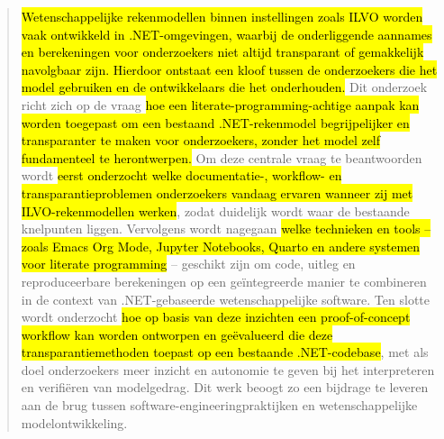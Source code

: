 \documentclass{hogent-article}
\begin{document}
\begin{abstract}

  \hl{Wetenschappelijke rekenmodellen binnen instellingen zoals ILVO worden vaak ontwikkeld in .NET-omgevingen, waarbij de onderliggende aannames en berekeningen voor onderzoekers niet altijd transparant of gemakkelijk navolgbaar zijn. Hierdoor ontstaat een kloof tussen de onderzoekers die het model gebruiken en de ontwikkelaars die het onderhouden.} Dit onderzoek richt zich op de vraag \hl{hoe een literate-programming-achtige aanpak kan worden toegepast om een bestaand .NET-rekenmodel begrijpelijker en transparanter te maken voor onderzoekers, zonder het model zelf fundamenteel te herontwerpen.} Om deze centrale vraag te beantwoorden wordt \hl{eerst onderzocht welke documentatie-, workflow- en transparantieproblemen onderzoekers vandaag ervaren wanneer zij met ILVO-rekenmodellen werken}, zodat duidelijk wordt waar de bestaande knelpunten liggen. Vervolgens wordt nagegaan \hl{welke technieken en tools – zoals Emacs Org Mode, Jupyter Notebooks, Quarto en andere systemen voor literate programming} – geschikt zijn om code, uitleg en reproduceerbare berekeningen op een geïntegreerde manier te combineren in de context van .NET-gebaseerde wetenschappelijke software. Ten slotte wordt onderzocht \hl{hoe op basis van deze inzichten een proof-of-concept workflow kan worden ontworpen en geëvalueerd die deze transparantiemethoden toepast op een bestaande .NET-codebase}, met als doel onderzoekers meer inzicht en autonomie te geven bij het interpreteren en verifiëren van modelgedrag. Dit werk beoogt zo een bijdrage te leveren aan de brug tussen software-engineeringpraktijken en wetenschappelijke modelontwikkeling.


\end{abstract}
\end{document}
